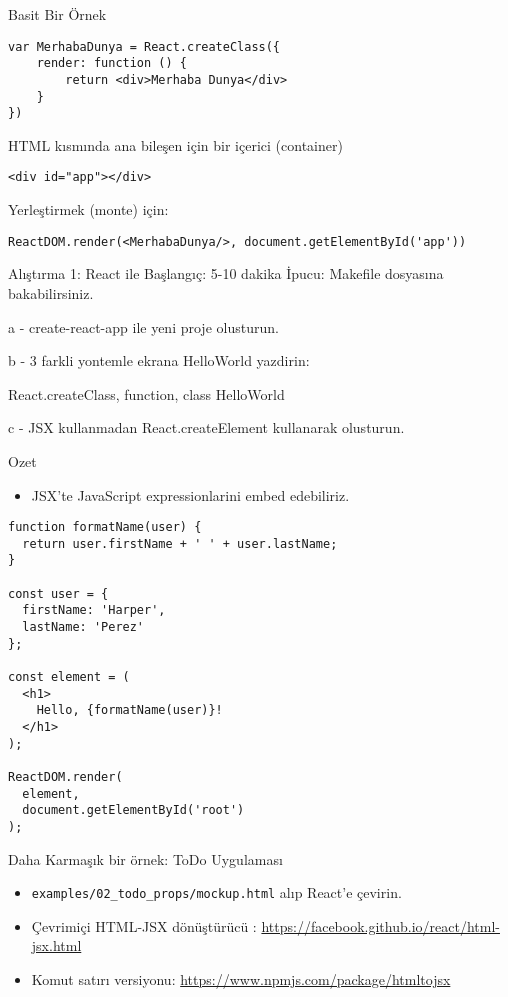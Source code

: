 \documentclass[presentation]{beamer}
\begin{document}
\begin{frame}[fragile,label={sec:orgfe76248}]{Basit Bir Örnek}
 \begin{verbatim}
var MerhabaDunya = React.createClass({
    render: function () {
	    return <div>Merhaba Dunya</div>
    }
})
\end{verbatim}

HTML kısmında ana bileşen için bir içerici (container)
\begin{verbatim}
<div id="app"></div>
\end{verbatim}
Yerleştirmek (monte) için:
\begin{verbatim}
ReactDOM.render(<MerhabaDunya/>, document.getElementById('app'))
\end{verbatim}
\end{frame}

\begin{frame}[label={sec:org210a2c6}]{Alıştırma 1: React ile Başlangıç: 5-10 dakika}
İpucu: Makefile dosyasına bakabilirsiniz.

a - create-react-app ile yeni proje olusturun.

b - 3 farkli yontemle ekrana HelloWorld yazdirin:

React.createClass, function, class HelloWorld

c - JSX kullanmadan React.createElement kullanarak olusturun.
\end{frame}

\begin{frame}[fragile,label={sec:org003dc2d}]{Ozet}
 \begin{itemize}
\item JSX'te JavaScript expressionlarini embed edebiliriz.
\end{itemize}

\begin{verbatim}
function formatName(user) {
  return user.firstName + ' ' + user.lastName;
}

const user = {
  firstName: 'Harper',
  lastName: 'Perez'
};

const element = (
  <h1>
    Hello, {formatName(user)}!
  </h1>
);

ReactDOM.render(
  element,
  document.getElementById('root')
);
\end{verbatim}
\end{frame}

\begin{frame}[fragile,label={sec:org8d24e0f}]{Daha Karmaşık bir örnek: ToDo Uygulaması}
 \begin{itemize}
\item \texttt{examples/02\_todo\_props/mockup.html} alıp React'e çevirin.
\item Çevrimiçi HTML-JSX dönüştürücü :
\url{https://facebook.github.io/react/html-jsx.html}
\item Komut satırı versiyonu: \url{https://www.npmjs.com/package/htmltojsx}
\end{itemize}
\end{frame}
\end{document}
